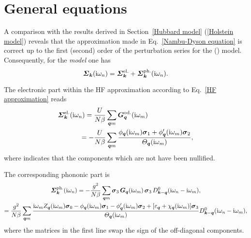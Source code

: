 \section{General equations}

A comparison with the results derived in Section~\ref{Hubbard model}
(\ref{Holstein model}) reveals that the approximation made in
Eq.~\ref{Nambu-Dyson equation} is correct up to the first (second) order of the
perturbation series for the  () model.
Consequently, for the \emph{ model} one has
%
\begin{equation*}
    \boldsymbol {\varSigma}_{\boldsymbol k} (\mathrm i \omega_n)
    = \boldsymbol {\varSigma}_{\boldsymbol k} \sp{\text{el.}}
    + \boldsymbol {\varSigma}_{\boldsymbol k} \sp{\text{ph.}} (\mathrm i \omega_n).
\end{equation*}

The electronic part within the HF approximation according to Eq.~\ref{HF
approximation} reads
%
\begin{align*}
    \boldsymbol {\varSigma}_{\boldsymbol k} \sp{\text{el.}} (\mathrm i \omega_n)
    = \frac{U}{N \beta} &\sum_{\boldsymbol q m}
        \boldsymbol G_{\boldsymbol q} \sp{\text{od.}} (\mathrm i \omega_m)
    \\
    = -\frac{U}{N \beta} &\sum_{\boldsymbol q m} \frac
        { \phi _{\boldsymbol q}(\mathrm i \omega_m) \boldsymbol \sigma_1
        + \phi'_{\boldsymbol q}(\mathrm i \omega_m) \boldsymbol \sigma_2 }
        {\varTheta_{\boldsymbol q}(\mathrm i \omega_m)},
\end{align*}
%
where  indicates that the components which are not  have
been nullified.

The corresponding phononic part is
%
\begin{multline*}
    \boldsymbol {\varSigma}_{\boldsymbol k} \sp{\text{ph.}} (\mathrm i \omega_n)
    = -\frac{g^2}{N \beta} \sum_{\boldsymbol q m}
    \boldsymbol \sigma_3 \, \boldsymbol G_{\boldsymbol q}(\mathrm i \omega_m) \, \boldsymbol \sigma_3 \,
    D^0_{\boldsymbol k - \boldsymbol q}(\mathrm i \omega_n - \mathrm i \omega_m),
    \\
    = \frac{g^2}{N \beta} \sum_{\boldsymbol q m}
    \frac { \mathrm i \omega_m
              Z_{\boldsymbol q}(\mathrm i \omega_m) \boldsymbol \sigma_0
        - \phi _{\boldsymbol q}(\mathrm i \omega_m) \boldsymbol \sigma_1
        - \phi'_{\boldsymbol q}(\mathrm i \omega_m) \boldsymbol \sigma_2
        + [\varepsilon_{\boldsymbol q} + \chi_{\boldsymbol q}(\mathrm i \omega_m)] \boldsymbol \sigma_3 }
        {\varTheta_{\boldsymbol q}(\mathrm i \omega_m)}
    D^0_{\boldsymbol k - \boldsymbol q}(\mathrm i \omega_n - \mathrm i \omega_m),
\end{multline*}
%
where the  matrices in the first line swap the sign of the
off-diagonal components.

